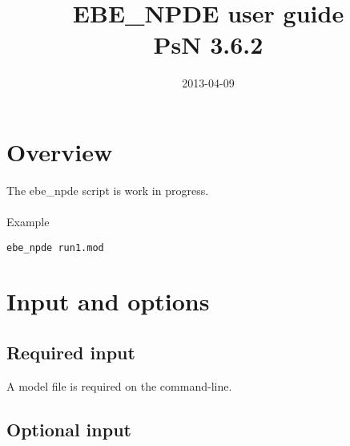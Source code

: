 \documentclass[a4paper,12pt]{article}
\title{EBE\_NPDE user guide\\ \vspace{2 mm} {\large PsN 3.6.2}}
\date{2013-04-09}
\begin{document}
\maketitle


\section{Overview}

The ebe\_npde script is work in progress.
\\
\\
Example
\begin{verbatim}
ebe_npde run1.mod
\end{verbatim}

\section{Input and options}

\subsection{Required input}

A model file is required on the command-line.

\subsection{Optional input}
\end{document}
